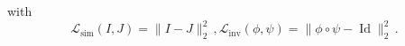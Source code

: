 \documentclass[10pt,twocolumn,letterpaper]{article} %
\begin{document}
with
\begin{equation}
    \mathcal{L}_{\text{sim}}(I,J) = \|I-J\|_2^2\,,
    \mathcal{L}_{\text{inv}}(\phi,\psi) = \|\phi \circ \psi - \operatorname{Id}\|_2^2\,.
\end{equation}
\end{document}
